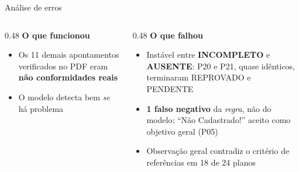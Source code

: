 \documentclass[aspectratio=169,11pt,xcolor=table]{beamer}
\newcommand{\inc}{{\bfseries\color{ifcamarelo}INCOMPLETO}}
\newcommand{\aus}{{\bfseries\color{ifcvermelho}AUSENTE}}
\begin{document}
\begin{frame}{Análise de erros}
  \begin{columns}[T]
    \begin{column}{0.48\textwidth}
      {\bfseries O que funcionou}\par\medskip
      \begin{itemize}\small\setlength\itemsep{0.5em}
        \item Os 11 demais apontamentos verificados no PDF eram \textbf{não conformidades reais}
        \item O modelo detecta bem \emph{se} há problema
      \end{itemize}
    \end{column}
    \begin{column}{0.48\textwidth}
      {\color{ifcvermelho}\bfseries O que falhou}\par\medskip
      \begin{itemize}\small\setlength\itemsep{0.5em}
        \item Instável entre \inc{} e \aus{}: P20 e P21, quase idênticos, terminaram
              REPROVADO e PENDENTE
        \item \textbf{1 falso negativo} da \emph{regra}, não do modelo: ``Não Cadastrado!''
              aceito como objetivo geral (P05)
        \item Observação geral contradiz o critério de referências em 18 de 24 planos
      \end{itemize}
    \end{column}
  \end{columns}
\end{frame}
\end{document}
